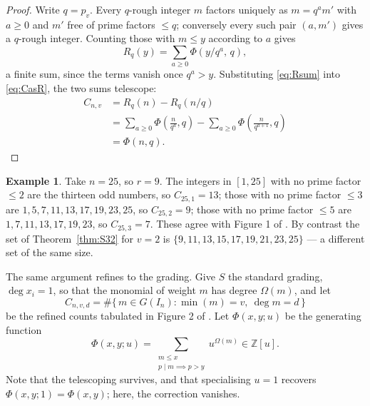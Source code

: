 \documentclass[a4paper,11pt,oneside,reqno]{amsart}
\theoremstyle{definition}
\newtheorem{example}[definition]{Example}
\theoremstyle{remark}
\theoremstyle{plain}
\newcommand{\ZZ}{\mathbb{Z}}
\newcommand{\Om}{\Omega}
\begin{document}
\begin{proof}
  Write \(q = p_v\). Every \(q\)-rough integer \(m\) factors uniquely as
  \(m = q^{a}m'\) with \(a \ge 0\) and \(m'\) free of prime factors \(\le q\);
  conversely every such pair \((a,m')\) gives a \(q\)-rough integer. Counting
  those with \(m \le y\) according to \(a\) gives
  \begin{equation}\label{eq:Rsum}
    R_q(y) = \sum_{a \ge 0}\Phi\!\left(y/q^{a},\,q\right),
  \end{equation}
  a finite sum, since the terms vanish once \(q^{a} > y\). Substituting
  \eqref{eq:Rsum} into \eqref{eq:CasR}, the two sums telescope:
  \begin{equation}\label{eq:telescope}
  \begin{split}
    C_{n,v}&= R_q(n)-R_q(n/q)\\
           &= \sum_{a \ge 0}\Phi\!\left(\frac{n}{q^{a}},q\right)
            -\sum_{a \ge 0}\Phi\!\left(\frac{n}{q^{a+1}},q\right)\\
           &= \Phi(n,q).
  \end{split}
  \end{equation}
\end{proof}

\begin{example}\label{ex:n25}
  Take \(n = 25\), so \(r = 9\). The integers in \([1,25]\) with no prime factor
  \(\le 2\) are the thirteen odd numbers, so \(C_{25,1} = 13\); those with no
  prime factor \(\le 3\) are \(1,5,7,11,13,17,19,23,25\), so \(C_{25,2} = 9\);
  those with no prime factor \(\le 5\) are \(1,7,11,13,17,19,23\), so
  \(C_{25,3} = 7\). These agree with Figure 1 of \cite{Snellman2000}. By contrast
  the set of Theorem~\ref{thm:S32} for \(v = 2\) is
  \(\{9,11,13,15,17,19,21,23,25\}\) --- a different set of the same size.
\end{example}

The same argument refines to the grading. Give \(S\) the standard grading,
\(\deg x_i = 1\), so that the monomial of weight \(m\) has degree \(\Om(m)\), and
let
\begin{equation}\label{eq:Cvddef}
  C_{n,v,d} = \#\{\,m \in G(I_n) : \min(m) = v,\ \deg m = d\,\}
\end{equation}
be the refined counts tabulated in Figure 2 of \cite{Snellman2000}. Let
\(\Phi(x,y;u)\) be the generating function
\begin{equation}\label{eq:phiu}
  \Phi(x,y;u) = \sum_{\substack{m \le x\\ p \mid m \implies p > y}} u^{\Om(m)}
    \in \ZZ[u].
\end{equation}
Note that the telescoping survives, and that specialising \(u = 1\) recovers
\(\Phi(x,y;1) = \Phi(x,y)\); here, the correction vanishes.
\end{document}
